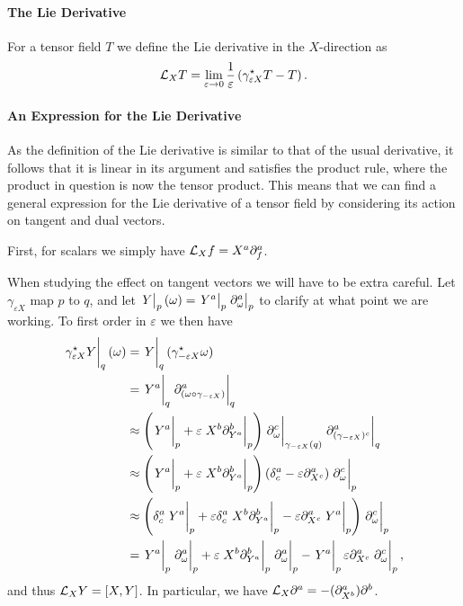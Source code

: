 \paragraph{The Lie Derivative}
For a tensor field $T$ we define the Lie derivative in the $X$-direction as
\begin{align*}
	\mathcal{L}_{X}T = \lim\limits_{\varepsilon\to 0}\frac{1}{\varepsilon}\left(\gamma_{\varepsilon X}^{\star}T - T\right).
\end{align*}

\paragraph{An Expression for the Lie Derivative}
As the definition of the Lie derivative is similar to that of the usual derivative, it follows that it is linear in its argument and satisfies the product rule, where the product in question is now the tensor product. This means that we can find a general expression for the Lie derivative of a tensor field by considering its action on tangent and dual vectors.

First, for scalars we simply have $\mathcal{L}_{X}f = X^{a}\partial^{a}_{f}$.

When studying the effect on tangent vectors we will have to be extra careful. Let $\gamma_{\varepsilon X}$ map $p$ to $q$, and let $\eval{Y}_{p}(\omega) = \eval{Y^{a}}_{p}\eval{\del{a}{\omega}}_{p}$ to clarify at what point we are working. To first order in $\varepsilon$ we then have
\begin{align*}
	\eval{\pub{\gamma_{\varepsilon X}}{Y}}_{q}(\omega) &= \eval{Y}_{q}(\pub{\gamma_{-\varepsilon X}}{\omega}) \\
	                                                   &= \eval{Y^{a}}_{q}\eval{\del{a}{(\omega\circ\gamma_{-\varepsilon X})}}_{q} \\
	                                                   &\approx \left(\eval{Y^{a}}_{p} + \varepsilon\eval{ X^{b}\del{b}{Y^{a}}}_{p}\right) \eval{\del{c}{\omega}}_{\gamma_{-\varepsilon X}(q)}\eval{\del{a}{(\gamma_{-\varepsilon X})^{c}}}_{q} \\
	                                                   &\approx \left(\eval{Y^{a}}_{p} + \varepsilon\eval{ X^{b}\del{b}{Y^{a}}}_{p}\right) \left(\kdelta{a}{c} - \varepsilon\del{a}{X^{c}}\right)\eval{\del{c}{\omega}}_{p} \\
	                                                   &\approx \left(\kdelta{a}{c}\eval{Y^{a}}_{p} + \varepsilon\kdelta{a}{c}\eval{ X^{b}\del{b}{Y^{a}}}_{p} - \varepsilon\del{a}{X^{c}}\eval{Y^{a}}_{p}\right)\eval{\del{c}{\omega}}_{p} \\
	                                                   &= \eval{Y^{a}}_{p}\eval{\del{a}{\omega}}_{p} + \varepsilon\eval{ X^{b}\del{b}{Y^{a}}}_{p}\eval{\del{a}{\omega}}_{p} - \eval{Y^{a}}_{p}\varepsilon\del{a}{X^{c}}\eval{\del{c}{\omega}}_{p},
\end{align*}
and thus $\lied{X}{Y} = \comm{X}{Y}$. In particular, we have $\mathcal{L}_{X}\partial^{a}_{} = -(\partial^{a}_{X^{b}})\partial^{b}_{}$.

